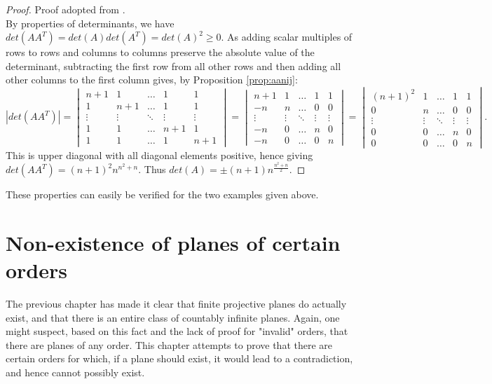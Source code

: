\documentclass{report}
\theoremstyle{definition}\newtheorem*{definition}{Definition}
\theoremstyle{definition}\newtheorem*{example}{Example}
\theoremstyle{remark}\newtheorem*{remark}{Remark}
\begin{document}
\begin{proof}
Proof adopted from \cite{kahrstrom}. \\
By properties of determinants, we have $ det(AA^T) = det(A)det(A^T) = det(A)^2 \ge 0 $. As adding scalar multiples of rows to rows and columns to columns preserve the absolute value of the determinant, subtracting the first row from all other rows and then adding all other columns to the first column gives, by Proposition \ref{prop:aanij}: $$ \left| det(AA^T) \right| = \begin{vmatrix} n + 1 & 1 & \dots & 1 & 1 \\ 1 & n + 1 & \dots & 1 & 1 \\ \vdots & \vdots & \ddots & \vdots & \vdots \\ 1 & 1 & \dots & n + 1 & 1 \\ 1 & 1 & \dots & 1 & n + 1 \end{vmatrix} = \begin{vmatrix} n + 1 & 1 & \dots & 1 & 1 \\ -n & n & \dots & 0 & 0 \\ \vdots & \vdots & \ddots & \vdots & \vdots \\ -n & 0 & \dots & n & 0 \\ -n & 0 & \dots & 0 & n \end{vmatrix} = \begin{vmatrix} (n + 1)^2 & 1 & \dots & 1 & 1 \\ 0 & n & \dots & 0 & 0 \\ \vdots & \vdots & \ddots & \vdots & \vdots \\ 0 & 0 & \dots & n & 0 \\ 0 & 0 & \dots & 0 & n \end{vmatrix}. $$ This is upper diagonal with all diagonal elements positive, hence giving $ det(AA^T) = (n + 1)^2 n^{n^2 + n} $. Thus $ det(A) = \pm (n + 1) n^{\frac{n^2 + n}{2}} $.
\end{proof}

These properties can easily be verified for the two examples given above.

\chapter{Non-existence of planes of certain orders}

The previous chapter has made it clear that finite projective planes do actually exist, and that there is an entire class of countably infinite planes. Again, one might suspect, based on this fact and the lack of proof for "invalid" orders, that there are planes of any order. This chapter attempts to prove that there are certain orders for which, if a plane should exist, it would lead to a contradiction, and hence cannot possibly exist.
\end{document}
